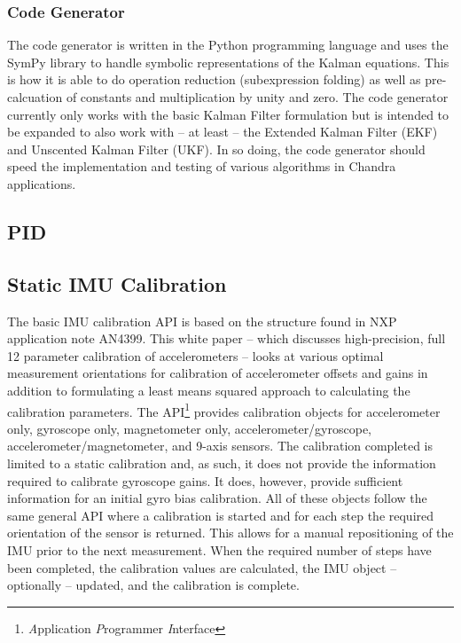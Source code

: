 \documentclass[10pt,letterpaper]{memoir} %
\begin{document}
\subsubsection{Code Generator}
The code generator is written in the Python programming language and uses the SymPy library to handle symbolic representations of the Kalman equations.  This is how it is able to do operation reduction (subexpression folding) as well as pre-calcuation of constants and multiplication by unity and zero.  The code generator currently only works with the basic Kalman Filter formulation but is intended to be expanded to also work with -- at least -- the Extended Kalman Filter (EKF) and Unscented Kalman Filter (UKF).  In so doing, the code generator should speed the implementation and testing of various algorithms in Chandra applications.

\subsection{PID}

\subsection{Static IMU Calibration}
The basic IMU calibration API is based on the structure found in NXP application note AN4399.  This white paper -- which discusses high-precision, full 12 parameter calibration of accelerometers -- looks at various optimal measurement orientations for calibration of accelerometer offsets and gains in addition to formulating a least means squared approach to calculating the calibration parameters.  The API\footnote{\emph{A}pplication \emph{P}rogrammer \emph{I}nterface} provides calibration objects for accelerometer only, gyroscope only, magnetometer only, accelerometer/gyroscope, accelerometer/magnetometer, and 9-axis sensors.  The calibration completed is limited to a static calibration and, as such, it does not provide the information required to calibrate gyroscope gains.  It does, however, provide sufficient information for an initial gyro bias calibration.  All of these objects follow the same general API where a calibration is started and for each step the required orientation of the sensor is returned.  This allows for a manual repositioning of the IMU prior to the next measurement.  When the required number of steps have been completed, the calibration values are calculated, the IMU object -- optionally -- updated, and the calibration is complete.
\end{document}
